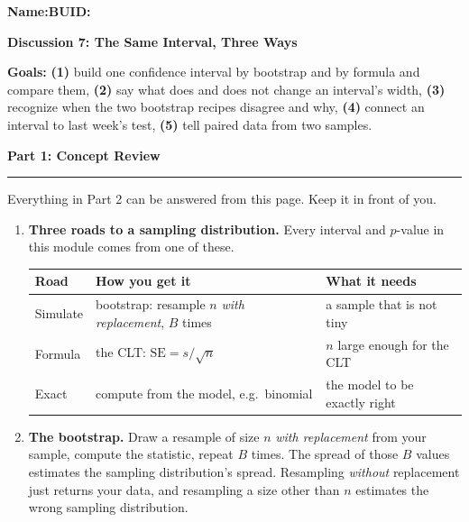 \documentclass[11pt]{article}
\newcommand{\blankline}[1]{\underline{\hspace{#1}}}
\newcommand{\parttitle}[1]{%
  \par\medskip\noindent
  {\large\bfseries #1}\par
  \vspace{-.5em}\noindent\rule{\linewidth}{0.4pt}\par\smallskip}
\begin{document}
\noindent\textbf{Name:}\blankline{2.3in}\hfill\textbf{BUID:}\blankline{1.6in}

\begin{center}
  {\Large\bfseries Discussion 7: The Same Interval, Three Ways}
\end{center}

\noindent\textbf{Goals:} \textbf{(1)} build one confidence interval by bootstrap and by formula and
compare them, \textbf{(2)} say what does and does not change an interval's width, \textbf{(3)}
recognize when the two bootstrap recipes disagree and why, \textbf{(4)} connect an interval to last
week's test, \textbf{(5)} tell paired data from two samples.

\parttitle{Part 1: Concept Review}

{\small

\noindent Everything in Part 2 can be answered from this page. Keep it in front of you.

\begin{enumerate}[label=\textbf{\arabic*.}, wide=0pt, itemsep=.45em, topsep=.5em]

\item \textbf{Three roads to a sampling distribution.} Every interval and $p$-value in this module
comes from one of these.

\begin{center}
\renewcommand{\arraystretch}{1.15}
\begin{tabular}{lll}
\toprule
\textbf{Road} & \textbf{How you get it} & \textbf{What it needs} \\
\midrule
Simulate & bootstrap: resample $n$ \emph{with replacement}, $B$ times & a sample that is not tiny \\
Formula & the CLT: $\text{SE} = s/\sqrt{n}$ & $n$ large enough for the CLT \\
Exact & compute from the model, e.g.\ binomial & the model to be exactly right \\
\bottomrule
\end{tabular}
\end{center}

\item \textbf{The bootstrap.} Draw a resample of size $n$ \emph{with replacement} from your sample,
compute the statistic, repeat $B$ times. The spread of those $B$ values estimates the sampling
distribution's spread. Resampling \emph{without} replacement just returns your data, and resampling
a size other than $n$ estimates the wrong sampling distribution.


\end{enumerate}}
\end{document}
